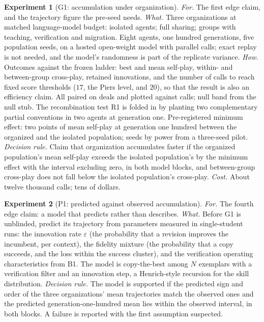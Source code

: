 \documentclass[11pt]{article}
\numberwithin{theorem}{section}
\theoremstyle{definition}
\theoremstyle{problemstyle}
\newtheorem{experiment}{Experiment}[section]
\begin{document}
\begin{experiment}[G1: accumulation under organization]\label{exp:g1}
\emph{For.} The first edge claim, and the trajectory figure the pre-seed needs.
\emph{What.} Three organizations at matched language-model budget: isolated agents; full sharing; groups with teaching,
verification and migration. Eight agents, one hundred generations, five population seeds, on a hosted open-weight
model with parallel calls; exact replay is not needed, and the model's randomness is part of the replicate variance.
\emph{How.} Outcomes against the frozen ladder: best and mean self-play, within- and between-group cross-play,
retained innovations, and the number of calls to reach fixed score thresholds ($17$, the Piers level, and $20$), so
that the result is also an efficiency claim. All paired on deals and plotted against calls; null band from the null
stub. The recombination test R1 is folded in by planting two complementary partial conventions in two agents at
generation one. Pre-registered minimum effect: two points of mean self-play at generation one hundred between the
organized and the isolated population; seeds by power from a three-seed pilot.
\emph{Decision rule.} Claim that organization accumulates faster if the organized population's mean self-play exceeds
the isolated population's by the minimum effect with the interval excluding zero, in both model blocks, and
between-group cross-play does not fall below the isolated population's cross-play.
\emph{Cost.} About twelve thousand calls; tens of dollars.
\end{experiment}

\begin{experiment}[P1: predicted against observed accumulation]\label{exp:p1}
\emph{For.} The fourth edge claim: a model that predicts rather than describes.
\emph{What.} Before G1 is unblinded, predict its trajectory from parameters measured in single-student runs: the
innovation rate $\varepsilon$ (the probability that a revision improves the incumbent, per context), the fidelity
mixture (the probability that a copy succeeds, and the loss within the success cluster), and the verification operating
characteristics from B1. The model is copy-the-best among $N$ exemplars with a verification filter and an innovation
step, a Henrich-style recursion for the skill distribution.
\emph{Decision rule.} The model is supported if the predicted sign and order of the three organizations' mean
trajectories match the observed ones and the predicted generation-one-hundred mean lies within the observed interval,
in both blocks. A failure is reported with the first assumption suspected.
\end{experiment}
\end{document}

